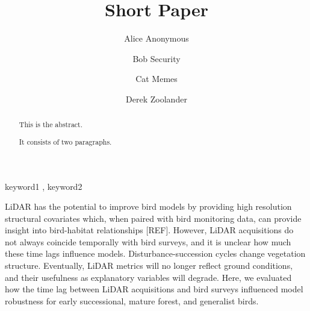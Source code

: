 \documentclass[preprint, 3p,
authoryear]{elsarticle} %
\begin{document}
\begin{frontmatter}

  \title{Short Paper}
    \author[Some Institute of Technology]{Alice Anonymous%
  }
    \author[Another University]{Bob Security}
    \author[Another University]{Cat Memes%
  }
    \author[Some Institute of Technology]{Derek Zoolander%
  }
  
  \begin{abstract}
  This is the abstract.

  It consists of two paragraphs.
  \end{abstract}
    \begin{keyword}
    keyword1 \sep 
    keyword2
  \end{keyword}
  
 \end{frontmatter}

LiDAR has the potential to improve bird models by providing high
resolution structural covariates which, when paired with bird monitoring
data, can provide insight into bird-habitat relationships {[}REF{]}.
However, LiDAR acquisitions do not always coincide temporally with bird
surveys, and it is unclear how much these time lags influence models.
Disturbance-succession cycles change vegetation structure. Eventually,
LiDAR metrics will no longer reflect ground conditions, and their
usefulness as explanatory variables will degrade. Here, we evaluated how
the time lag between LiDAR acquisitions and bird surveys influenced
model robustness for early successional, mature forest, and generalist
birds.
\end{document}

